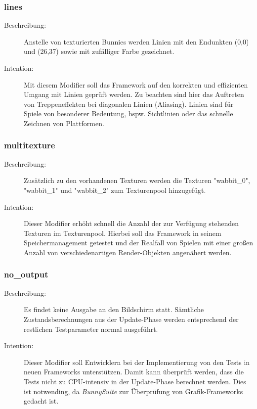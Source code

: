 \subsubsection{lines}
\begin{description}
\item[Beschreibung:] Anstelle von texturierten Bunnies werden Linien mit den Endunkten (0,0) und (26,37) sowie mit zufälliger Farbe gezeichnet. \\
\item[Intention:] Mit diesem Modifier soll das Framework auf den korrekten und effizienten Umgang mit Linien geprüft werden. Zu beachten sind hier das Auftreten von Treppeneffekten bei diagonalen Linien (Aliasing). Linien sind für Spiele von besonderer Bedeutung, bspw. Sichtlinien oder das schnelle Zeichnen von Plattformen.
\end{description}

\subsubsection{multitexture}
\begin{description}
\item[Beschreibung:] Zusätzlich zu den vorhandenen Texturen werden die Texturen "wabbit\_0", "wabbit\_1" und "wabbit\_2" zum Texturenpool hinzugefügt. \\
\item[Intention:] Dieser Modifier erhöht schnell die Anzahl der zur Verfügung stehenden Texturen im Texturenpool. Hierbei soll das Framework in seinem Speichermanagement getestet und der Realfall von Spielen mit einer großen Anzahl von verschiedenartigen Render-Objekten angenähert werden.
\end{description}

\subsubsection{no\_output}
\begin{description}
\item[Beschreibung:] Es findet keine Ausgabe an den Bildschirm statt. Sämtliche Zustandsberechnungen aus der Update-Phase werden entsprechend der restlichen Testparameter normal ausgeführt. \\
\item[Intention:] Dieser Modifier soll Entwicklern bei der Implementierung von den Tests in neuen Frameworks unterstützen. Damit kann überprüft werden, dass die Tests nicht zu CPU-intensiv in der Update-Phase berechnet werden. Dies ist notwending, da \textit{BunnySuite} zur Überprüfung von Grafik-Frameworks gedacht ist.
\end{description}

